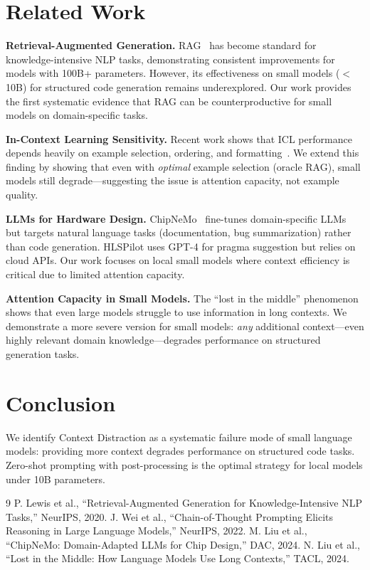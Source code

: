 \documentclass[11pt]{article}
\begin{document}
\section{Related Work}

\textbf{Retrieval-Augmented Generation.}
RAG~\cite{lewis2020rag} has become standard for knowledge-intensive
NLP tasks, demonstrating consistent improvements for models with
100B+ parameters. However, its effectiveness on small models ($<$10B)
for structured code generation remains underexplored. Our work provides
the first systematic evidence that RAG can be counterproductive for
small models on domain-specific tasks.

\textbf{In-Context Learning Sensitivity.}
Recent work shows that ICL performance depends heavily on example
selection, ordering, and formatting~\cite{wei2022cot}. We extend
this finding by showing that even with \emph{optimal} example selection
(oracle RAG), small models still degrade---suggesting the issue is
attention capacity, not example quality.

\textbf{LLMs for Hardware Design.}
ChipNeMo~\cite{chipnemo} fine-tunes domain-specific LLMs but targets
natural language tasks (documentation, bug summarization) rather than
code generation. HLSPilot uses GPT-4 for pragma suggestion but relies
on cloud APIs. Our work focuses on local small models where context
efficiency is critical due to limited attention capacity.

\textbf{Attention Capacity in Small Models.}
The ``lost in the middle'' phenomenon~\cite{liu2024lost} shows that
even large models struggle to use information in long contexts. We
demonstrate a more severe version for small models: \emph{any}
additional context---even highly relevant domain knowledge---degrades
performance on structured generation tasks.

\section{Conclusion}

We identify Context Distraction as a systematic failure mode of
small language models: providing more context degrades performance
on structured code tasks. Zero-shot prompting with post-processing
is the optimal strategy for local models under 10B parameters.


\begin{thebibliography}{9}
 P. Lewis et al., ``Retrieval-Augmented Generation for Knowledge-Intensive NLP Tasks,'' NeurIPS, 2020.
 J. Wei et al., ``Chain-of-Thought Prompting Elicits Reasoning in Large Language Models,'' NeurIPS, 2022.
 M. Liu et al., ``ChipNeMo: Domain-Adapted LLMs for Chip Design,'' DAC, 2024.
 N. Liu et al., ``Lost in the Middle: How Language Models Use Long Contexts,'' TACL, 2024.
\end{thebibliography}
\end{document}
